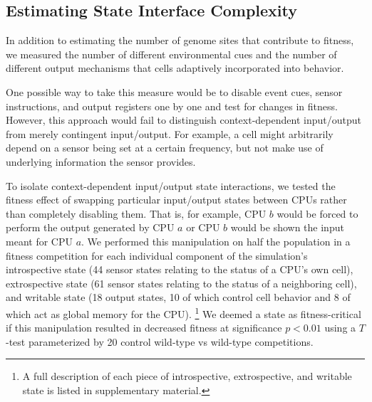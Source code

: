 

\subsection{Estimating State Interface Complexity}
\label{sec:estimating-state-interface-complexity;ch:measuring-cna}

In addition to estimating the number of genome sites that contribute to fitness, we measured the number of different environmental cues and the number of different output mechanisms that cells adaptively incorporated into behavior.

One possible way to take this measure would be to disable event cues, sensor instructions, and output registers one by one and test for changes in fitness.
However, this approach would fail to distinguish context-dependent input/output from merely contingent input/output.
For example, a cell might arbitrarily depend on a sensor being set at a certain frequency, but not make use of underlying information the sensor provides.

To isolate context-dependent input/output state interactions, we tested the fitness effect of swapping particular input/output states between CPUs rather than completely disabling them.
That is, for example, CPU $b$ would be forced to perform the output generated by CPU $a$ or CPU $b$ would be shown the input meant for CPU $a$.
We performed this manipulation on half the population in a fitness competition for each individual component of the simulation's introspective state (44 sensor states relating to the status of a CPU's own cell), extrospective state (61 sensor states relating to the status of a neighboring cell), and writable state (18 output states, 10 of which control cell behavior and 8 of which act as global memory for the CPU).
\footnote{
A full description of each piece of introspective, extrospective, and writable state is listed in supplementary material.
}
We deemed a state as fitness-critical if this manipulation resulted in decreased fitness at significance $p < 0.01$ using a $T$-test parameterized by 20 control wild-type vs wild-type competitions.

